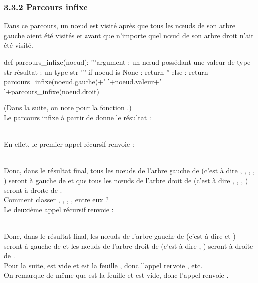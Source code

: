 \documentclass[11pt,a4paper,french,twoside]{PMCours}
\begin{document}
\subsubsection*{3.3.2 Parcours infixe}
Dans ce parcours, un nœud est visité après que tous les nœuds de son arbre gauche aient été visités et avant que n'importe quel nœud de son arbre droit n'ait été visité.  
\begin{Python}
def parcours_infixe(noeud):
	'''argument  : un nœud possédant une valeur de type str 
	résultat : un type str '''  
	if noeud is None :
		return ''
	else :
		return parcours_infixe(noeud.gauche)+' '+noeud.valeur+' '+parcours_infixe(noeud.droit)
\end{Python} 
(Dans la suite, on note  pour la fonction  .)\\
Le parcours infixe à partir de  donne le résultat :\\
\centerline{} \\
En effet, le premier appel récursif renvoie :\\
\centerline{}\\
Donc, dans le résultat final, tous les nœuds de l'arbre gauche de  (c'est à dire , , , , ) seront à gauche de  et que tous les nœuds de l'arbre droit de  (c'est à dire , , , ) seront à droite de .\\
Comment classer , , , ,  entre eux ? \\
Le deuxième appel récursif renvoie :\\
\centerline{}\\
Donc, dans le résultat final, les nœuds de l'arbre gauche de  (c'est à dire  et ) seront à gauche de  et les nœuds de l'arbre droit de  (c'est à dire , ) seront à droite de .\\
Pour la suite,  est vide et  est la feuille , donc l'appel  renvoie , etc.\\
On remarque de même que  est la feuille  et  est vide, donc l'appel  renvoie .
%
%
\end{document}
